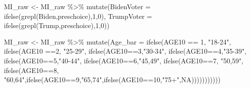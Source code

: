 \documentclass[
]{article}
\newenvironment{Shaded}{\begin{snugshade}}{\end{snugshade}}
\newcommand{\AttributeTok}[1]{\textcolor[rgb]{0.77,0.63,0.00}{#1}}
\newcommand{\ConstantTok}[1]{\textcolor[rgb]{0.00,0.00,0.00}{#1}}
\newcommand{\DecValTok}[1]{\textcolor[rgb]{0.00,0.00,0.81}{#1}}
\newcommand{\FunctionTok}[1]{\textcolor[rgb]{0.00,0.00,0.00}{#1}}
\newcommand{\NormalTok}[1]{#1}
\newcommand{\OtherTok}[1]{\textcolor[rgb]{0.56,0.35,0.01}{#1}}
\newcommand{\SpecialCharTok}[1]{\textcolor[rgb]{0.00,0.00,0.00}{#1}}
\newcommand{\StringTok}[1]{\textcolor[rgb]{0.31,0.60,0.02}{#1}}
\begin{document}
\begin{Shaded}
\begin{Highlighting}[]
\NormalTok{MI\_raw }\OtherTok{\textless{}{-}}\NormalTok{ MI\_raw }\SpecialCharTok{\%\textgreater{}\%}
  \FunctionTok{mutate}\NormalTok{(}\AttributeTok{BidenVoter =} \FunctionTok{ifelse}\NormalTok{(}\FunctionTok{grepl}\NormalTok{(}\StringTok{\textquotesingle{}Biden\textquotesingle{}}\NormalTok{,preschoice),}\DecValTok{1}\NormalTok{,}\DecValTok{0}\NormalTok{),}
         \AttributeTok{TrumpVoter =} \FunctionTok{ifelse}\NormalTok{(}\FunctionTok{grepl}\NormalTok{(}\StringTok{\textquotesingle{}Trump\textquotesingle{}}\NormalTok{,preschoice),}\DecValTok{1}\NormalTok{,}\DecValTok{0}\NormalTok{))}

\NormalTok{MI\_raw }\OtherTok{\textless{}{-}}\NormalTok{ MI\_raw }\SpecialCharTok{\%\textgreater{}\%}
  \FunctionTok{mutate}\NormalTok{(}\AttributeTok{Age\_bar =} \FunctionTok{ifelse}\NormalTok{(AGE10 }\SpecialCharTok{==} \DecValTok{1}\NormalTok{, }\StringTok{"18{-}24"}\NormalTok{,}
                          \FunctionTok{ifelse}\NormalTok{(AGE10 }\SpecialCharTok{==}\DecValTok{2}\NormalTok{, }\StringTok{"25{-}29"}\NormalTok{,}
                                 \FunctionTok{ifelse}\NormalTok{(AGE10}\SpecialCharTok{==}\DecValTok{3}\NormalTok{,}\StringTok{"30{-}34"}\NormalTok{,}
                                        \FunctionTok{ifelse}\NormalTok{(AGE10}\SpecialCharTok{==}\DecValTok{4}\NormalTok{,}\StringTok{"35{-}39"}\NormalTok{,}
                                               \FunctionTok{ifelse}\NormalTok{(AGE10}\SpecialCharTok{==}\DecValTok{5}\NormalTok{,}\StringTok{"40{-}44"}\NormalTok{,}
                                                      \FunctionTok{ifelse}\NormalTok{(AGE10}\SpecialCharTok{==}\DecValTok{6}\NormalTok{,}\StringTok{"45,49"}\NormalTok{,}
                                                             \FunctionTok{ifelse}\NormalTok{(AGE10}\SpecialCharTok{==}\DecValTok{7}\NormalTok{, }\StringTok{"50,59"}\NormalTok{,}
                                                                    \FunctionTok{ifelse}\NormalTok{(AGE10}\SpecialCharTok{==}\DecValTok{8}\NormalTok{, }\StringTok{"60,64"}\NormalTok{,}\FunctionTok{ifelse}\NormalTok{(AGE10}\SpecialCharTok{==}\DecValTok{9}\NormalTok{,}\StringTok{"65,74"}\NormalTok{,}\FunctionTok{ifelse}\NormalTok{(AGE10}\SpecialCharTok{==}\DecValTok{10}\NormalTok{,}\StringTok{"75+"}\NormalTok{,}\ConstantTok{NA}\NormalTok{)))))))))))}


\end{Highlighting}
\end{Shaded}
\end{document}
